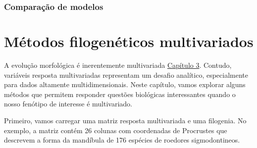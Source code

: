 \documentclass[
]{book}
\newenvironment{Shaded}{\begin{snugshade}}{\end{snugshade}}
\newcommand{\CommentTok}[1]{\textcolor[rgb]{0.56,0.35,0.01}{\textit{#1}}}
\newcommand{\FunctionTok}[1]{\textcolor[rgb]{0.13,0.29,0.53}{\textbf{#1}}}
\newcommand{\NormalTok}[1]{#1}
\newcommand{\OtherTok}[1]{\textcolor[rgb]{0.56,0.35,0.01}{#1}}
\newcommand{\SpecialCharTok}[1]{\textcolor[rgb]{0.81,0.36,0.00}{\textbf{#1}}}
\newcommand{\StringTok}[1]{\textcolor[rgb]{0.31,0.60,0.02}{#1}}
\begin{document}
\subsection{Comparação de modelos}\label{comparauxe7uxe3o-de-modelos-2}

\begin{Shaded}
\end{Shaded}

\chapter{Métodos filogenéticos multivariados}\label{muxe9todos-filogenuxe9ticos-multivariados}

A evolução morfológica é inerentemente multivariada \hyperref[cap3]{Capítulo 3}. Contudo, variáveis resposta multivariadas representam um desafio analítico, especialmente para dados altamente multidimensionais. Neste capítulo, vamos explorar alguns métodos que permitem responder questões biológicas interessantes quando o nosso fenótipo de interesse é multivariado.

Primeiro, vamos carregar uma matriz resposta multivariada e uma filogenia. No exemplo, a matriz contém 26 colunas com coordenadas de Procrustes que descrevem a forma da mandíbula de 176 espécies de roedores sigmodontineos.
\end{document}
